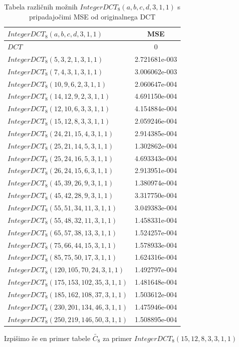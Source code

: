\documentclass[a4paper,12pt,openright]{book}
\begin{document}
\begin{table}[ht]
\centering
\begin{tabular}{|l|c|}
\hline
$IntegerDCT_8(a,b,c,d,3,1,1)$              &MSE          \\
\hline
$DCT                                     $ &0             \\
$IntegerDCT_8(5, 3, 2, 1, 3, 1, 1)       $ &2.721681e-003\\ 
$IntegerDCT_8(7, 4, 3, 1, 3, 1, 1)       $ &3.006062e-003\\ 
$IntegerDCT_8(10, 9, 6, 2, 3, 1, 1)      $ &2.060647e-004\\ 
$IntegerDCT_8(14, 12, 9, 2, 3, 1, 1)     $ &4.691150e-004\\ 
$IntegerDCT_8(12, 10, 6, 3, 3, 1, 1)     $ &4.154884e-004\\ 
$IntegerDCT_8(15, 12, 8, 3, 3, 1, 1)     $ &2.059246e-004\\ 
$IntegerDCT_8(24, 21, 15, 4, 3, 1, 1)    $ &2.914385e-004\\ 
$IntegerDCT_8(25, 21, 14, 5, 3, 1, 1)    $ &1.302862e-004\\ 
$IntegerDCT_8(25, 24, 16, 5, 3, 1, 1)    $ &4.693343e-004\\ 
$IntegerDCT_8(26, 24, 15, 6, 3, 1, 1)    $ &2.913951e-004\\ 
$IntegerDCT_8(45, 39, 26, 9, 3, 1, 1)    $ &1.380974e-004\\ 
$IntegerDCT_8(45, 42, 28, 9, 3, 1, 1)    $ &3.317750e-004\\ 
$IntegerDCT_8(55, 51, 34, 11, 3, 1, 1)   $ &3.049383e-004\\ 
$IntegerDCT_8(55, 48, 32, 11, 3, 1, 1)   $ &1.458331e-004\\ 
$IntegerDCT_8(65, 57, 38, 13, 3, 1, 1)   $ &1.524257e-004\\ 
$IntegerDCT_8(75, 66, 44, 15, 3, 1, 1)   $ &1.578933e-004\\ 
$IntegerDCT_8(85, 75, 50, 17, 3, 1, 1)   $ &1.624316e-004\\ 
$IntegerDCT_8(120, 105, 70, 24, 3, 1, 1) $ &1.492797e-004\\ 
$IntegerDCT_8(175, 153, 102, 35, 3, 1, 1)$ &1.481648e-004\\ 
$IntegerDCT_8(185, 162, 108, 37, 3, 1, 1)$ &1.503612e-004\\ 
$IntegerDCT_8(230, 201, 134, 46, 3, 1, 1)$ &1.475946e-004\\ 
$IntegerDCT_8(250, 219, 146, 50, 3, 1, 1)$ &1.508895e-004\\
\hline
\end{tabular}
\caption{Tabela različnih možnih $IntegerDCT_8(a,b,c,d,3,1,1)$ s pripadajočimi MSE od originalnega DCT}
\label{tab:IntegerDCT_8}
\end{table}
Izpišimo še en primer tabele $\widetilde{C_8}$ za primer $IntegerDCT_8(15, 12, 8, 3, 3, 1, 1)$
\end{document}
